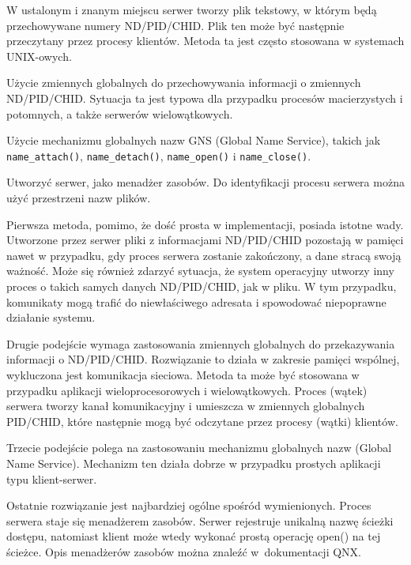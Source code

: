 \begin{myenumerate} 
\item W ustalonym i znanym miejscu serwer tworzy plik tekstowy, w którym będą przechowywane numery ND/PID/CHID. Plik ten może być następnie przeczytany przez procesy klientów. Metoda ta jest często stosowana w systemach UNIX-owych. 
\item Użycie zmiennych globalnych do przechowywania informacji o zmiennych ND/PID/CHID. Sytuacja ta jest typowa dla przypadku procesów macierzystych i potomnych, a także serwerów wielowątkowych.
\item Użycie mechanizmu globalnych nazw GNS (Global Name Service), takich jak \lstinline[style=MyCStyle]{name_attach()}, \lstinline[style=MyCStyle]{name_detach()}, \lstinline[style=MyCStyle]{name_open()} i \lstinline[style=MyCStyle]{name_close()}. 
\item Utworzyć serwer, jako menadżer zasobów. Do identyfikacji procesu serwera można użyć przestrzeni nazw plików. 
\end{myenumerate} 


Pierwsza metoda, pomimo, że dość prosta w implementacji, posiada istotne wady. Utworzone przez serwer pliki z informacjami ND/PID/CHID pozostają w pamięci nawet w przypadku, gdy proces serwera zostanie zakończony, a dane stracą swoją ważność. Może się również zdarzyć sytuacja, że system operacyjny utworzy inny proces o takich samych danych ND/PID/CHID, jak w pliku. W tym przypadku, komunikaty mogą trafić do niewłaściwego adresata i spowodować niepoprawne działanie systemu. 

Drugie podejście wymaga zastosowania zmiennych globalnych do przekazywania informacji o ND/PID/CHID. Rozwiązanie to działa w zakresie pamięci wspólnej, wykluczona jest komunikacja sieciowa. Metoda ta może być stosowana w przypadku aplikacji wieloprocesorowych i wielowątkowych. Proces (wątek) serwera tworzy kanał komunikacyjny i umieszcza w zmiennych globalnych PID/CHID, które następnie mogą być odczytane przez procesy (wątki) klientów. 

Trzecie podejście polega na zastosowaniu mechanizmu globalnych nazw (Global Name Service). Mechanizm ten działa dobrze w przypadku prostych aplikacji typu klient-serwer. 

Ostatnie rozwiązanie jest najbardziej ogólne spośród wymienionych. Proces serwera staje się menadżerem zasobów. Serwer rejestruje unikalną nazwę ścieżki dostępu, natomiast klient może wtedy wykonać prostą operację open() na tej ścieżce. Opis menadżerów zasobów można znaleźć w~dokumentacji QNX. 

